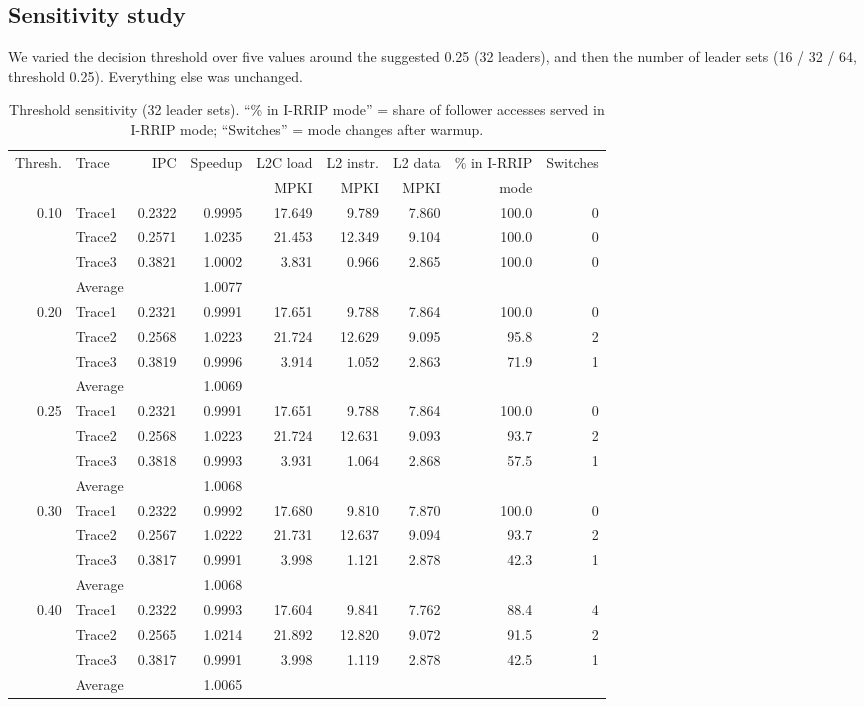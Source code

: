 \documentclass[11pt]{article}
\begin{document}
\subsection{Sensitivity study}
We varied the decision threshold over five values around the suggested 0.25
(32 leaders), and then the number of leader sets (16 / 32 / 64, threshold
0.25). Everything else was unchanged.

\begin{table}[H]
\centering
\small
\setlength{\tabcolsep}{4pt}
\begin{tabular}{rlrrrrrrr}
\toprule
Thresh. & Trace & IPC & Speedup & L2C load & L2 instr. & L2 data & \% in I-RRIP & Switches\\
        &       &     &         & MPKI     & MPKI      & MPKI    & mode         & \\
\midrule
0.10 & Trace1 & 0.2322 & 0.9995 & 17.649 &  9.789 & 7.860 & 100.0 & 0\\
     & Trace2 & 0.2571 & 1.0235 & 21.453 & 12.349 & 9.104 & 100.0 & 0\\
     & Trace3 & 0.3821 & 1.0002 &  3.831 &  0.966 & 2.865 & 100.0 & 0\\
     & Average &       & 1.0077 & & & & & \\
\midrule
0.20 & Trace1 & 0.2321 & 0.9991 & 17.651 &  9.788 & 7.864 & 100.0 & 0\\
     & Trace2 & 0.2568 & 1.0223 & 21.724 & 12.629 & 9.095 &  95.8 & 2\\
     & Trace3 & 0.3819 & 0.9996 &  3.914 &  1.052 & 2.863 &  71.9 & 1\\
     & Average &       & 1.0069 & & & & & \\
\midrule
0.25 & Trace1 & 0.2321 & 0.9991 & 17.651 &  9.788 & 7.864 & 100.0 & 0\\
     & Trace2 & 0.2568 & 1.0223 & 21.724 & 12.631 & 9.093 &  93.7 & 2\\
     & Trace3 & 0.3818 & 0.9993 &  3.931 &  1.064 & 2.868 &  57.5 & 1\\
     & Average &       & 1.0068 & & & & & \\
\midrule
0.30 & Trace1 & 0.2322 & 0.9992 & 17.680 &  9.810 & 7.870 & 100.0 & 0\\
     & Trace2 & 0.2567 & 1.0222 & 21.731 & 12.637 & 9.094 &  93.7 & 2\\
     & Trace3 & 0.3817 & 0.9991 &  3.998 &  1.121 & 2.878 &  42.3 & 1\\
     & Average &       & 1.0068 & & & & & \\
\midrule
0.40 & Trace1 & 0.2322 & 0.9993 & 17.604 &  9.841 & 7.762 &  88.4 & 4\\
     & Trace2 & 0.2565 & 1.0214 & 21.892 & 12.820 & 9.072 &  91.5 & 2\\
     & Trace3 & 0.3817 & 0.9991 &  3.998 &  1.119 & 2.878 &  42.5 & 1\\
     & Average &       & 1.0065 & & & & & \\
\bottomrule
\end{tabular}
\caption{Threshold sensitivity (32 leader sets). ``\% in I-RRIP mode'' = share
of follower accesses served in I-RRIP mode; ``Switches'' = mode changes after
warmup.}
\label{tab:t2b-threshold}
\end{table}
\end{document}
